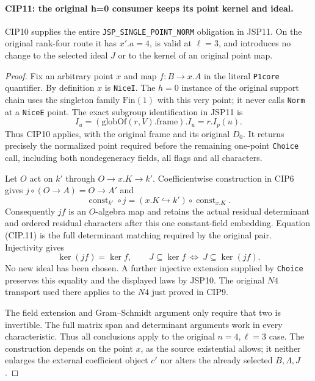\paragraph{CIP11: the original h=0 consumer keeps its point kernel and ideal.}
\label{claim:CIP11}
CIP10 supplies the entire \texttt{JSP\_SINGLE\_POINT\_NORM}
obligation in JSP11.  On the original rank-four route it has
$x'.a=4$, is valid at $\ell=3$, and introduces no change to
the selected ideal $J$ or to the kernel of an original point map.
\begin{proof}
Fix an arbitrary point $x$ and map $f:B\to x.A$ in the literal
\texttt{P1core} quantifier.  By definition $x$ is \texttt{NiceI}.
The $h=0$ instance of the original support chain uses the singleton
family $\mathrm{Fin}(1)$ with this very point; it never calls
\texttt{Norm} at a \texttt{NiceE} point.  The exact subgroup
identification in JSP11 is
\[
 I_u=(\mathrm{globOf}(r,V).\mathrm{frame}).I_u
                         =r.I_p(u).
\]
Thus CIP10 applies, with the original frame and its original $D_0$.
It returns precisely the normalized point required before the
remaining one-point \texttt{Choice} call, including both
nondegeneracy fields, all flags and all characters.

Let $O$ act on $k'$ through $O\to x.K\to k'$.
Coefficientwise construction in CIP6 gives
$j\circ(O\to A)=O\to A'$ and
\[
 \operatorname{const}_{k'}\circ j
              =(x.K\hookrightarrow k')\circ\operatorname{const}_{x.K}.
 \tag{CIP.14}
\]
Consequently $jf$ is an $O$-algebra map and retains the actual
residual determinant and ordered residual characters after this
one constant-field embedding.  Equation (CIP.11) is the full
determinant matching required by the original pair.  Injectivity
gives
\[
 \ker(jf)=\ker f,
 \qquad J\subseteq\ker f\ \Longleftrightarrow\ J\subseteq\ker(jf).
 \tag{CIP.15}
\]
No new ideal has been chosen.  A further injective extension supplied
by \texttt{Choice} preserves this equality and the displayed laws
by JSP10.  The original $N4$ transport used there applies to the
$N4$ just proved in CIP9.

The field extension and Gram--Schmidt argument only require that
two is invertible.  The full matrix span and determinant arguments
work in every characteristic.  Thus all conclusions apply to the
original $n=4,\ell=3$ case.  The construction depends on the point
$x$, as the source existential allows; it neither enlarges the
external coefficient object $c'$ nor alters the already selected
$B,\Lambda,J$.
\end{proof}

